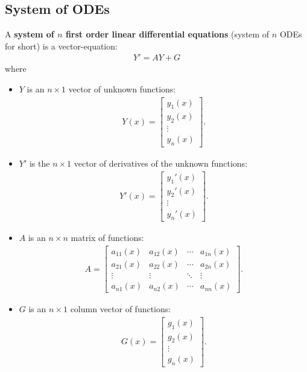 \documentclass[12pt,a4paper]{article}
\begin{document}
\subsection{System of ODEs}
A \textbf{system of $n$ first order linear differential equations} (system of $n$ ODEs for short) is a vector-equation:
	\begin{align*}
	Y' = AY + G
	\end{align*}
where
	\begin{itemize}
	\item $Y$ is an $n \times 1$ vector of unknown functions:
		\begin{align*}
		Y (x) = \begin{bmatrix}
		y_1 (x) \\ y_2 (x) \\ \vdots \\ y_n (x)
		\end{bmatrix} .
		\end{align*}
	\item $Y'$ is the $n \times 1$ vector of derivatives of the unknown functions:
		\begin{align*}
		Y' (x) = \begin{bmatrix}
		y_1'(x) \\ y_2' (x) \\ \vdots \\ y_n'(x)
		\end{bmatrix} .
		\end{align*}
	\item $A$ is an $n \times n$ matrix of functions:
		\begin{align*}
		A = \begin{bmatrix}
		a_{11}(x) & a_{12} (x) & \cdots & a_{1n} (x) \\
		a_{21} (x) & a_{22} (x) & \cdots & a_{2n} (x) \\
		\vdots & \vdots & \ddots & \vdots \\
		a_{n1} (x) & a_{n2} (x) & \cdots & a_{nn} (x)
		\end{bmatrix} .
		\end{align*}
	\item $G$ is an $n \times 1$ column vector of functions:
		\begin{align*}
		G (x) = \begin{bmatrix}
		g_1(x) \\ g_2 (x) \\ \vdots \\ g_n (x)
		\end{bmatrix} .
		\end{align*}
	\end{itemize}
	
\end{document}
